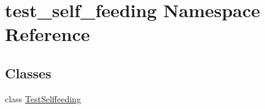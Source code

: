 \hypertarget{namespacetest__self__feeding}{}\section{test\+\_\+self\+\_\+feeding Namespace Reference}
\label{namespacetest__self__feeding}
\subsection*{Classes}
\begin{DoxyCompactItemize}
\item 
class \hyperlink{classtest__self__feeding_1_1TestSelffeeding}{Test\+Selffeeding}
\end{DoxyCompactItemize}
